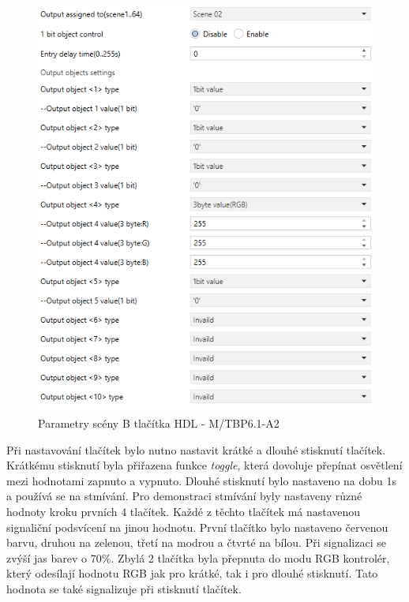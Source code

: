 \begin{figure}[!ht]
  \begin{center}
    \includegraphics[scale=0.4]{obrazky/Scena B.png}
  \end{center}
  \caption[Parametry scény B tlačítka HDL - M/TBP6.1-A2]{Parametry scény B tlačítka HDL - M/TBP6.1-A2}
  \label{fig:Parametry scény B tlačítka HDL - M/TBP6.1-A2}
\end{figure}

Při nastavování tlačítek bylo nutno nastavit krátké a dlouhé stisknutí tlačítek. Krátkému stisknutí byla přiřazena funkce \textit{toggle}, která dovoluje přepínat osvětlení mezi hodnotami zapnuto a vypnuto. Dlouhé stisknutí bylo nastaveno na dobu 1s a používá se na stmívání. Pro demonstraci stmívání byly nastaveny různé hodnoty kroku prvních 4 tlačítek. Každé z těchto tlačítek má nastavenou signaliční podsvícení na jinou hodnotu. První tlačítko bylo nastaveno červenou barvu, druhou na zelenou, třetí na modrou a čtvrté na bílou. Při signalizaci se zvýší jas barev o 70\%. Zbylá 2 tlačítka byla přepnuta do modu RGB kontrolér, který odesílají hodnotu RGB jak pro krátké, tak i pro dlouhé stisknutí. Tato hodnota se také signalizuje při stisknutí tlačítek. 


